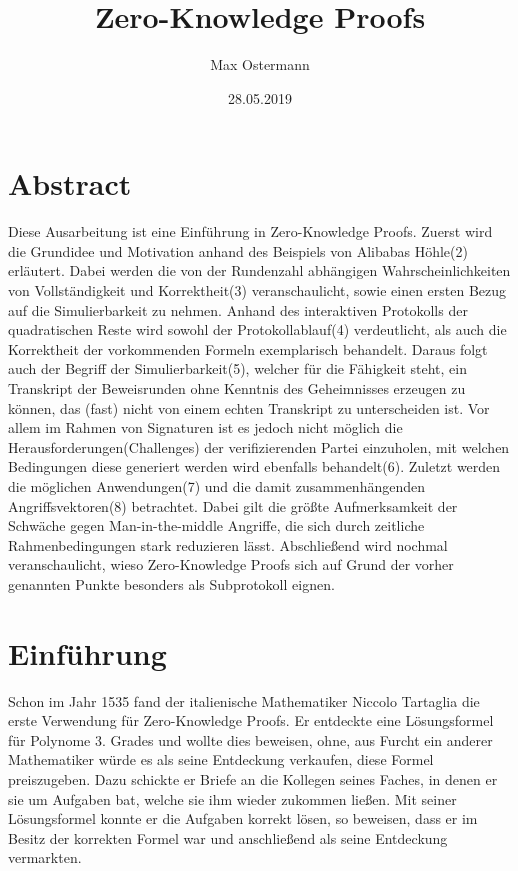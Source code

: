 \documentclass {article}
\title{Zero-Knowledge Proofs}
\author{Max Ostermann}
\date{28.05.2019}
\begin{document}
\maketitle
{}
\newpage
{}

\section{Abstract}
Diese Ausarbeitung ist eine Einführung in Zero-Knowledge Proofs.
Zuerst wird die Grundidee und Motivation anhand des Beispiels von Alibabas H\"ohle(2) erl\"autert. Dabei werden die von der Rundenzahl abh\"angigen Wahrscheinlichkeiten von Vollst\"andigkeit und Korrektheit(3) veranschaulicht, sowie einen ersten Bezug auf die Simulierbarkeit zu nehmen. Anhand des interaktiven Protokolls der quadratischen Reste wird sowohl der Protokollablauf(4) verdeutlicht, als auch die Korrektheit der vorkommenden Formeln exemplarisch behandelt. Daraus folgt auch der Begriff der Simulierbarkeit(5), welcher für die F\"ahigkeit steht, ein Transkript der Beweisrunden ohne Kenntnis des Geheimnisses erzeugen zu können, das (fast) nicht von einem echten Transkript zu unterscheiden ist. Vor allem im Rahmen von Signaturen ist es jedoch nicht m\"oglich die Herausforderungen(Challenges) der verifizierenden Partei einzuholen, mit welchen Bedingungen diese generiert werden wird ebenfalls behandelt(6). 
Zuletzt werden die m\"oglichen Anwendungen(7) und die damit zusammenh\"angenden Angriffsvektoren(8) betrachtet. Dabei gilt die gr\"oßte Aufmerksamkeit der Schw\"ache gegen Man-in-the-middle Angriffe, die sich durch zeitliche Rahmenbedingungen stark reduzieren l\"asst. Abschlie\ss{}end wird nochmal veranschaulicht, wieso Zero-Knowledge Proofs sich auf Grund der vorher genannten Punkte besonders als Subprotokoll eignen.


\newpage

\tableofcontents

\newpage 

\section{Einf\"uhrung}

Schon im Jahr 1535 fand der italienische Mathematiker Niccolo Tartaglia die erste Verwendung für Zero-Knowledge Proofs. Er entdeckte eine Lösungsformel für Polynome 3. Grades und wollte dies beweisen, ohne, aus Furcht ein anderer Mathematiker würde es als seine Entdeckung verkaufen, diese Formel preiszugeben. Dazu schickte er Briefe an die Kollegen seines Faches, in denen er sie um Aufgaben bat, welche sie ihm wieder zukommen lie\ss{}en. Mit seiner L\"osungsformel konnte er die Aufgaben korrekt l\"osen, so beweisen, dass er im Besitz der korrekten Formel war und anschlie\ss{}end als seine Entdeckung vermarkten. \\
\end{document}
